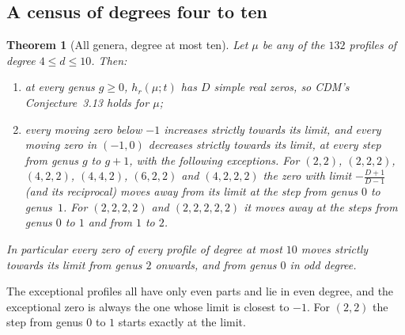 \documentclass[11pt,a4paper]{article}
\newtheorem{theorem}{Theorem}[section]
\theoremstyle{definition}\newtheorem{definition}[theorem]{Definition}
\theoremstyle{remark}\newtheorem{remark}[theorem]{Remark}\newtheorem{example}[theorem]{Example}
\numberwithin{equation}{section}
\begin{document}
\subsection{A census of degrees four to ten}
\begin{theorem}[All genera, degree at most ten]\label{th:census}
Let $\mu$ be any of the $132$ profiles of degree $4\le d\le10$. Then:
\begin{enumerate}
\item at every genus $g\ge0$, $h_r(\mu;t)$ has $D$ simple real zeros, so CDM's Conjecture~3.13 holds for $\mu$;
\item every moving zero below $-1$ increases strictly towards its limit, and every moving zero in $(-1,0)$ decreases strictly towards its limit, at every step from genus $g$ to $g+1$, with the following exceptions. For $(2,2)$, $(2,2,2)$, $(4,2,2)$, $(4,4,2)$, $(6,2,2)$ and $(4,2,2,2)$ the zero with limit $-\frac{D+1}{D-1}$ (and its reciprocal) moves away from its limit at the step from genus $0$ to genus~$1$. For $(2,2,2,2)$ and $(2,2,2,2,2)$ it moves away at the steps from genus $0$ to $1$ and from $1$ to $2$.
\end{enumerate}
In particular every zero of every profile of degree at most $10$ moves strictly towards its limit from genus $2$ onwards, and from genus $0$ in odd degree.
\end{theorem}

The exceptional profiles all have only even parts and lie in even degree, and the exceptional zero is always the one whose limit is closest to $-1$. For $(2,2)$ the step from genus $0$ to $1$ starts exactly at the limit.
\end{document}
